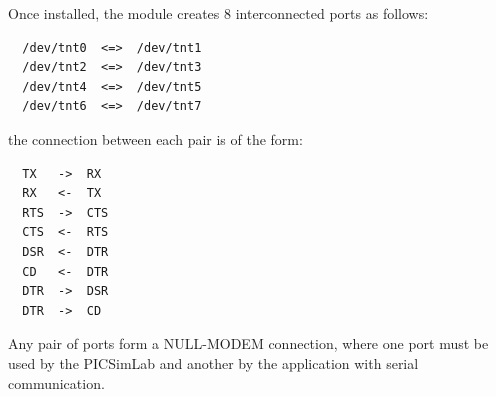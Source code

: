 Once installed, the module creates 8 interconnected ports as follows:
\begin{verbatim}
  /dev/tnt0  <=>  /dev/tnt1 
  /dev/tnt2  <=>  /dev/tnt3 
  /dev/tnt4  <=>  /dev/tnt5 
  /dev/tnt6  <=>  /dev/tnt7 
\end{verbatim}

the connection between each pair is of the form:
\begin{verbatim}  
  TX   ->  RX
  RX   <-  TX 	
  RTS  ->  CTS
  CTS  <-  RTS
  DSR  <-  DTR
  CD   <-  DTR
  DTR  ->  DSR
  DTR  ->  CD
\end{verbatim}

Any pair of ports form a NULL-MODEM connection, where one port must be used by the PICSimLab and another by the application with serial communication.
